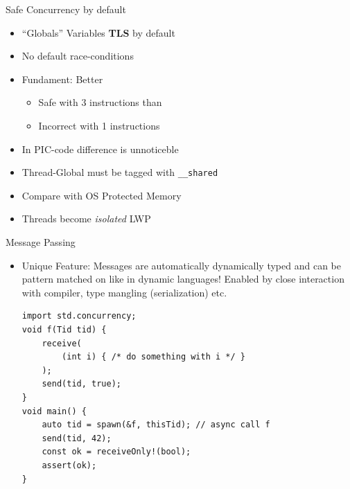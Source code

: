 \documentclass[xcolor=dvipsnames]{beamer}
\begin{document}
\begin{frame}[fragile]{Safe Concurrency by default}
  \begin{itemize}[<+->]
  \item ``Globals'' Variables \textbf{TLS} by default
  \item No default race-conditions
  \item Fundament: Better
    \begin{itemize}[<+->]
    \item Safe with 3 instructions than
    \item Incorrect with 1 instructions
    \end{itemize}
  \item In PIC-code difference is unnoticeble
  \item Thread-Global must be tagged with \texttt{\_\_shared}
  \item Compare with OS Protected Memory
  \item Threads become \emph{isolated} LWP
  \end{itemize}
\end{frame}

\begin{frame}[fragile]{Message Passing}
  \begin{itemize}[<+->]
  \item Unique Feature: Messages are automatically dynamically typed and can be
    pattern matched on like in dynamic languages! Enabled by close interaction
    with compiler, type mangling (serialization) etc.
\begin{lstlisting}[frame=single]
import std.concurrency;
void f(Tid tid) {
    receive(
        (int i) { /* do something with i */ }
    );
    send(tid, true);
}
void main() {
    auto tid = spawn(&f, thisTid); // async call f
    send(tid, 42);
    const ok = receiveOnly!(bool);
    assert(ok);
}
\end{lstlisting}
  \end{itemize}
\end{frame}
\end{document}
